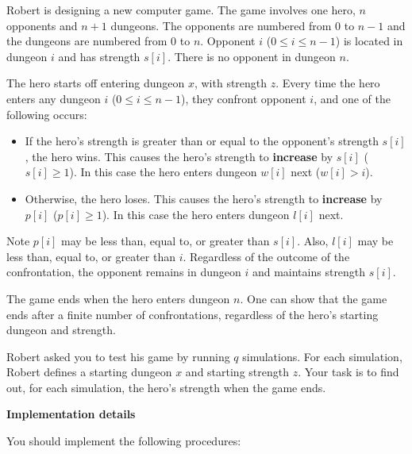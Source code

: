 Robert is designing a new computer game. The game involves one hero, $n$ opponents and $n+1$
dungeons. The opponents are numbered from $0$ to $n-1$ and the dungeons are numbered from $0$
to $n$. Opponent $i$ ($0 \leq i \leq n-1$) is located in dungeon $i$ and has strength $s[i]$. There is no
opponent in dungeon $n$.

The hero starts off entering dungeon $x$, with strength $z$. Every time the hero enters any dungeon $i$ ($0 \leq i \leq n-1$), they confront opponent $i$, and one of the following occurs:
\begin{itemize}
\item If the hero's strength is greater than or equal to the opponent's strength $s[i]$, the hero wins. This
causes the hero's strength to \textbf{increase} by $s[i]$ ($s[i] \geq 1$). In this case the hero enters dungeon $w[i]$ next ($w[i] > i$).
\item Otherwise, the hero loses. This causes the hero's strength to \textbf{increase} by $p[i]$ ($p[i] \geq 1$). In
this case the hero enters dungeon $l[i]$ next.
\end{itemize}

Note $p[i]$ may be less than, equal to, or greater than $s[i]$. Also, $l[i]$ may be less than, equal to, or
greater than $i$. Regardless of the outcome of the confrontation, the opponent remains in dungeon $i$ and maintains strength $s[i]$.

The game ends when the hero enters dungeon $n$. One can show that the game ends after a finite
number of confrontations, regardless of the hero's starting dungeon and strength.

Robert asked you to test his game by running $q$ simulations. For each simulation, Robert defines a
starting dungeon $x$ and starting strength $z$. Your task is to find out, for each simulation, the hero's
strength when the game ends.

\textbf{Implementation details}

You should implement the following procedures:

